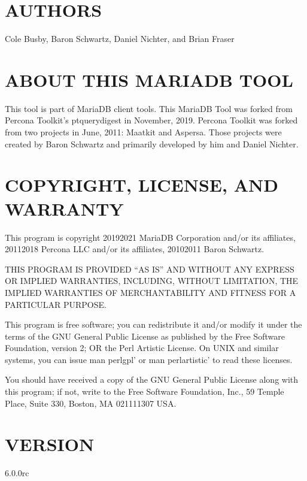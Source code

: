 \documentclass[letterpaper,10pt,english]{sphinxmanual}
\begin{document}
\section{AUTHORS}
\label{\detokenize{mariadb-query-digest:authors}}
Cole Busby, Baron Schwartz, Daniel Nichter, and Brian Fraser


\section{ABOUT THIS MARIADB TOOL}
\label{\detokenize{mariadb-query-digest:about-this-mariadb-tool}}
This tool is part of MariaDB client tools. This MariaDB Tool was forked from
Percona Toolkit’s pt\sphinxhyphen{}query\sphinxhyphen{}digest in November, 2019.  Percona Toolkit was
forked from two projects in June, 2011: Maatkit and Aspersa.  Those projects
were created by Baron Schwartz and primarily developed by him and Daniel
Nichter.


\section{COPYRIGHT, LICENSE, AND WARRANTY}
\label{\detokenize{mariadb-query-digest:copyright-license-and-warranty}}
This program is copyright 2019\sphinxhyphen{}2021 MariaDB Corporation and/or its affiliates,
2011\sphinxhyphen{}2018 Percona LLC and/or its affiliates, 2010\sphinxhyphen{}2011 Baron Schwartz.

THIS PROGRAM IS PROVIDED “AS IS” AND WITHOUT ANY EXPRESS OR IMPLIED
WARRANTIES, INCLUDING, WITHOUT LIMITATION, THE IMPLIED WARRANTIES OF
MERCHANTABILITY AND FITNESS FOR A PARTICULAR PURPOSE.

This program is free software; you can redistribute it and/or modify it under
the terms of the GNU General Public License as published by the Free Software
Foundation, version 2; OR the Perl Artistic License.  On UNIX and similar
systems, you can issue \textasciigrave{}man perlgpl’ or \textasciigrave{}man perlartistic’ to read these
licenses.

You should have received a copy of the GNU General Public License along with
this program; if not, write to the Free Software Foundation, Inc., 59 Temple
Place, Suite 330, Boston, MA  02111\sphinxhyphen{}1307  USA.


\section{VERSION}
\label{\detokenize{mariadb-query-digest:version}}
 6.0.0rc
\end{document}
